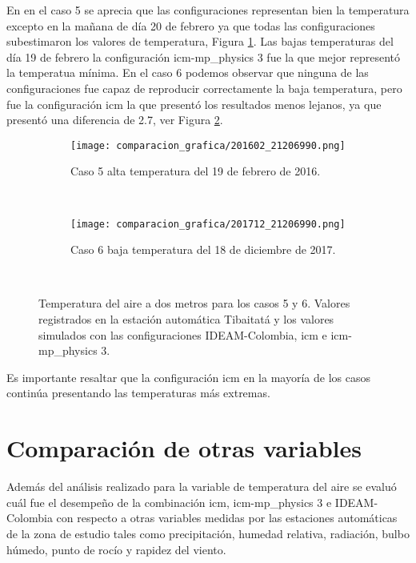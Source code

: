 En en el caso 5 se aprecia que las configuraciones representan bien la temperatura excepto en la mañana de día 20 de febrero ya que todas las configuraciones subestimaron los valores de temperatura, Figura \ref{caso5_tiba_wrf}. Las bajas temperaturas del día 19 de febrero la configuración icm-mp\_physics 3 fue la que mejor representó la temperatua mínima. En el caso 6 podemos observar que ninguna de las configuraciones fue capaz de reproducir correctamente la baja temperatura, pero fue la configuración icm la que presentó los resultados menos lejanos, ya que presentó una diferencia de 2.7\celc, ver Figura \ref{caso6_tiba_wrf}.


\begin{figure}[H]
\centering    
\begin{subfigure}[normla]{0.4\textwidth}
\caption{Caso 5 alta temperatura del 19 de febrero de 2016.}
\label{caso5_tiba_wrf}
\texttt{[image: comparacion\_grafica/201602\_21206990.png]}
\end{subfigure}
~
\begin{subfigure}[normla]{0.4\textwidth}
\caption{Caso 6 baja temperatura del 18 de diciembre de 2017.}
\label{caso6_tiba_wrf}
\texttt{[image: comparacion\_grafica/201712\_21206990.png]}
\end{subfigure}
~

    \caption{Temperatura del aire a dos metros para los casos 5 y 6. Valores registrados en la estación automática Tibaitatá y los valores simulados con las configuraciones IDEAM-Colombia, icm e icm-mp\_physics 3.}
    \label{fig:wrf_temp_tibaitata}

\end{figure}

Es importante resaltar que la configuración icm en la mayoría de los casos continúa presentando las temperaturas más extremas.\\

\section{Comparación de otras variables}

Además del análisis realizado para la variable de temperatura del aire se evaluó cuál fue el desempeño de la combinación icm, icm-mp\_physics 3 e IDEAM-Colombia con respecto a otras variables medidas por las estaciones automáticas de la zona de estudio tales como precipitación, humedad relativa, radiación, bulbo húmedo, punto de rocío y rapidez del viento.\\

